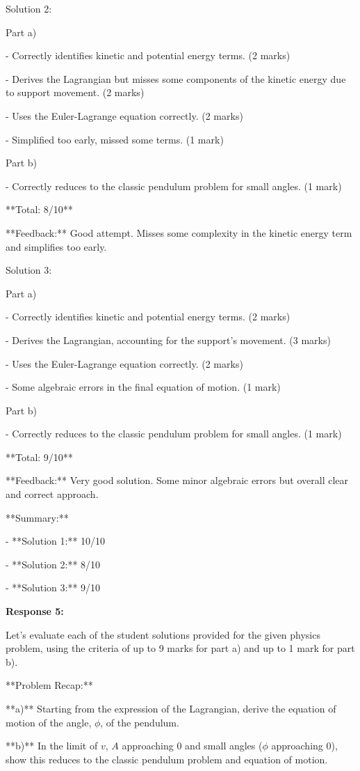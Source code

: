\documentclass[a4paper,11pt]{article}
\begin{document}
Solution 2:

Part a)

- Correctly identifies kinetic and potential energy terms. (2 marks)

- Derives the Lagrangian but misses some components of the kinetic energy due to support movement. (2 marks)

- Uses the Euler-Lagrange equation correctly. (2 marks)

- Simplified too early, missed some terms. (1 mark)
  
Part b)

- Correctly reduces to the classic pendulum problem for small angles. (1 mark)

**Total: 8/10**

**Feedback:** Good attempt. Misses some complexity in the kinetic energy term and simplifies too early.

Solution 3:

Part a)

- Correctly identifies kinetic and potential energy terms. (2 marks)

- Derives the Lagrangian, accounting for the support's movement. (3 marks)

- Uses the Euler-Lagrange equation correctly. (2 marks)

- Some algebraic errors in the final equation of motion. (1 mark)
  
Part b)

- Correctly reduces to the classic pendulum problem for small angles. (1 mark)

**Total: 9/10**

**Feedback:** Very good solution. Some minor algebraic errors but overall clear and correct approach.

**Summary:**

- **Solution 1:** 10/10

- **Solution 2:** 8/10

- **Solution 3:** 9/10

\bigskip
\textbf{Response 5:}

Let's evaluate each of the student solutions provided for the given physics problem, using the criteria of up to 9 marks for part a) and up to 1 mark for part b).

**Problem Recap:**

**a)** Starting from the expression of the Lagrangian, derive the equation of motion of the angle, \( \phi \), of the pendulum.

**b)** In the limit of \( v \), \(A\) approaching 0 and small angles (\( \phi \) approaching 0), show this reduces to the classic pendulum problem and equation of motion.
\end{document}
